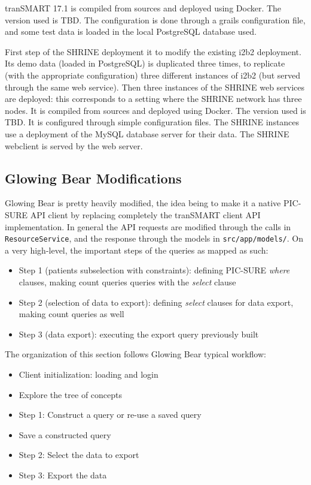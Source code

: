 tranSMART 17.1 is compiled from sources and deployed using Docker.
The version used is TBD.
The configuration is done through a grails configuration file, and some test data is loaded in the local PostgreSQL database used.

First step of the SHRINE deployment it to modify the existing i2b2 deployment.
Its demo data (loaded in PostgreSQL) is duplicated three times, to replicate (with the appropriate configuration) three different instances of i2b2 (but served through the same web service).
Then three instances of the SHRINE web services are deployed: this corresponds to a setting where the SHRINE network has three nodes.
It is compiled from sources and deployed using Docker. 
The version used is TBD.
It is configured through simple configuration files.
The SHRINE instances use a deployment of the MySQL database server for their data.
The SHRINE webclient is served by the web server.

\subsection{Glowing Bear Modifications}

Glowing Bear is pretty heavily modified, the idea being to make it a native PIC-SURE API client by replacing completely the tranSMART client API implementation. 
In general the API requests are modified through the calls in \verb|ResourceService|, and the response through the models in \verb|src/app/models/|.
On a very high-level, the important steps of the queries as mapped as such:
\begin{itemize}
    \item Step 1 (patients subselection with constraints): defining PIC-SURE \emph{where} clauses, making count queries queries with the \emph{select} clause
    \item Step 2 (selection of data to export): defining \emph{select} clauses for data export, making count queries as well
    \item Step 3 (data export): executing the export query previously built
\end{itemize}

The organization of this section follows Glowing Bear typical workflow:
\begin{itemize}
    \item Client initialization: loading and login
    \item Explore the tree of concepts
    \item Step 1: Construct a query or re-use a saved query
    \item Save a constructed query
    \item Step 2: Select the data to export
    \item Step 3: Export the data
\end{itemize}

